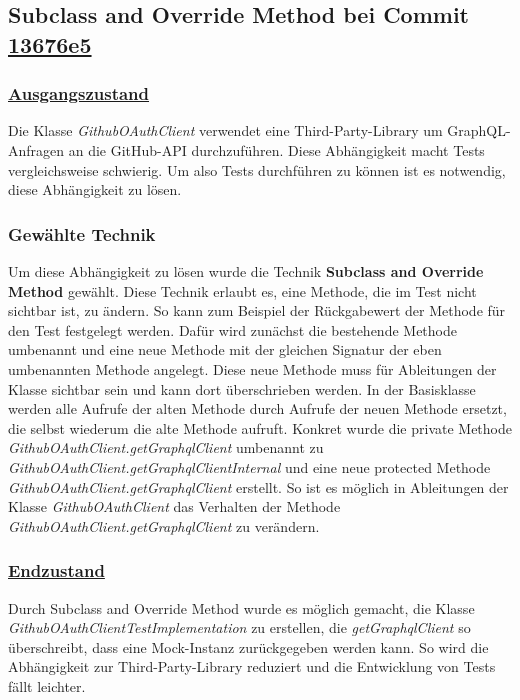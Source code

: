 \newpage

\subsection{Subclass and Override Method bei Commit \href{https://github.com/lukaspanni/OpenSourceStats/commit/13676e52a506bd02a06fa26087c93b2620ccd3c2} {13676e5}}

\subsubsection*{\href{https://github.com/lukaspanni/OpenSourceStats/tree/9385bb4b9e20b5503e3ea72acd392185f0c533db/app/src/main/java/de/lukaspanni/opensourcestats/client}{Ausgangszustand}}

Die Klasse \textit{GithubOAuthClient} verwendet eine Third-Party-Library um GraphQL-Anfragen an die GitHub-API durchzuführen.
Diese Abhängigkeit macht Tests vergleichsweise schwierig. Um also Tests durchführen zu können ist es notwendig, diese Abhängigkeit zu lösen.

\subsubsection*{Gewählte Technik}
Um diese Abhängigkeit zu lösen wurde die Technik \textbf{Subclass and Override Method} gewählt. Diese Technik erlaubt es, eine Methode, die im Test nicht sichtbar ist, zu ändern.
So kann zum Beispiel der Rückgabewert der Methode für den Test festgelegt werden.
Dafür wird zunächst die bestehende Methode umbenannt und eine neue Methode mit der gleichen Signatur der eben umbenannten Methode angelegt.
Diese neue Methode muss für Ableitungen der Klasse sichtbar sein und kann dort überschrieben werden. 
In der Basisklasse werden alle Aufrufe der alten Methode durch Aufrufe der neuen Methode ersetzt, die selbst wiederum die alte Methode aufruft.
\newline
Konkret wurde die private Methode \textit{GithubOAuthClient.getGraphqlClient} umbenannt zu \textit{GithubOAuthClient.getGraphqlClientInternal} und eine neue protected Methode \textit{GithubOAuthClient.getGraphqlClient} erstellt. So ist es möglich in Ableitungen der Klasse \textit{GithubOAuthClient} das Verhalten der Methode \textit{GithubOAuthClient.getGraphqlClient} zu verändern.

\subsubsection*{\href{https://github.com/lukaspanni/OpenSourceStats/tree/13676e52a506bd02a06fa26087c93b2620ccd3c2/app/src/main/java/de/lukaspanni/opensourcestats/client}{Endzustand}}
Durch Subclass and Override Method wurde es möglich gemacht, die Klasse \textit{GithubOAuthClientTestImplementation} zu erstellen, die \textit{getGraphqlClient} so überschreibt, dass eine Mock-Instanz zurückgegeben werden kann.
So wird die Abhängigkeit zur Third-Party-Library  reduziert und die Entwicklung von Tests fällt leichter.
